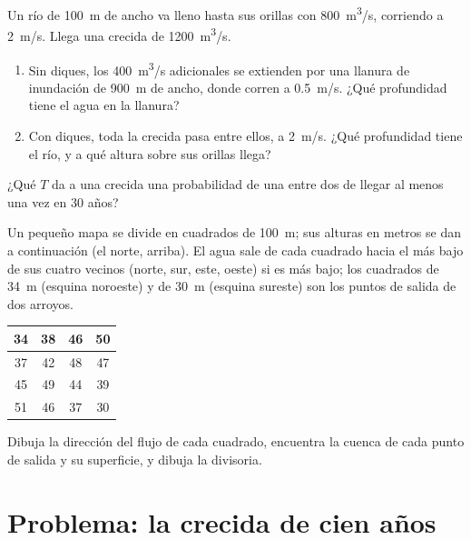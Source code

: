 \begin{exercise}[$\star\star\star$]\label{exo:g10:drainage-basins:13}
Un río de \qty{100}{m} de ancho va lleno hasta sus orillas con
\qty{800}{m^3/s}, corriendo a \qty{2}{m/s}. Llega una crecida de
\qty{1200}{m^3/s}.
\begin{enumerate}
  \item Sin diques, los \qty{400}{m^3/s} adicionales se extienden por una
        llanura de inundación de \qty{900}{m} de ancho, donde corren a
        \qty{0.5}{m/s}. ¿Qué profundidad tiene el agua en la llanura?
  \item Con diques, toda la crecida pasa entre ellos, a \qty{2}{m/s}.
        ¿Qué profundidad tiene el río, y a qué altura sobre sus orillas
        llega?
\end{enumerate}
\end{exercise}

\begin{exercise}[$\star\star\star$]\label{exo:g10:drainage-basins:14}
¿Qué  $T$ da a una crecida una probabilidad de una entre
dos de llegar al menos una vez en \num{30} años?
\end{exercise}

\begin{exercise}[$\star\star\star$]\label{exo:g10:drainage-basins:15}
Un pequeño mapa se divide en cuadrados de \qty{100}{m}; sus alturas en metros
se dan a continuación (el norte, arriba). El agua sale de cada cuadrado hacia
el más bajo de sus cuatro vecinos (norte, sur, este, oeste) si es más bajo;
los cuadrados de \qty{34}{m} (esquina noroeste) y de \qty{30}{m} (esquina
sureste) son los puntos de salida de dos arroyos.
\begin{center}
\begin{tabular}{|c|c|c|c|}
\hline
34 & 38 & 46 & 50 \\ \hline
37 & 42 & 48 & 47 \\ \hline
45 & 49 & 44 & 39 \\ \hline
51 & 46 & 37 & 30 \\ \hline
\end{tabular}
\end{center}
Dibuja la dirección del flujo de cada cuadrado, encuentra la cuenca de cada
punto de salida y su superficie, y dibuja la divisoria.
\end{exercise}

\section{Problema: la crecida de cien años}

